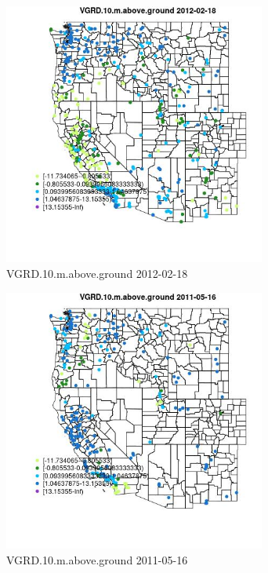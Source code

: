 \begin{figure} 
\centering  
\includegraphics[width=0.77\textwidth]{Code_Outputs/Report_ML_input_PM25_Step4_part_f_de_duplicated_aves_prioritize_24hr_obswNAs_MapObsVGRD10maboveground2012-02-18.jpg} 
\caption{\label{fig:Report_ML_input_PM25_Step4_part_f_de_duplicated_aves_prioritize_24hr_obswNAsMapObsVGRD10maboveground2012-02-18}VGRD.10.m.above.ground 2012-02-18} 
\end{figure} 
 

\begin{figure} 
\centering  
\includegraphics[width=0.77\textwidth]{Code_Outputs/Report_ML_input_PM25_Step4_part_f_de_duplicated_aves_prioritize_24hr_obswNAs_MapObsVGRD10maboveground2011-05-16.jpg} 
\caption{\label{fig:Report_ML_input_PM25_Step4_part_f_de_duplicated_aves_prioritize_24hr_obswNAsMapObsVGRD10maboveground2011-05-16}VGRD.10.m.above.ground 2011-05-16} 
\end{figure} 
 

